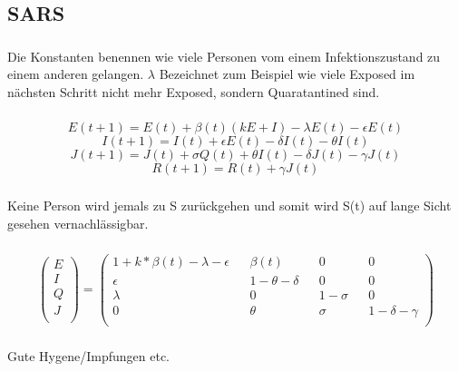 \documentclass{article}
\begin{document}
\subsection{SARS}

\subsubsection{}
Die Konstanten benennen wie viele Personen vom einem Infektionszustand zu einem anderen gelangen.
$\lambda$ Bezeichnet zum Beispiel wie viele Exposed im nächsten Schritt nicht mehr Exposed, sondern Quaratantined sind.

\subsubsection{}
$$E(t+1) = E(t) + \beta(t)(kE+I) - \lambda E(t) - \epsilon E(t) $$
$$I(t+1) = I(t) + \epsilon E(t) - \delta I(t) - \theta I(t)$$
$$J(t+1) = J(t) + \sigma Q(t) + \theta I(t) - \delta J(t) - \gamma J(t)$$
$$R(t+1) = R(t) + \gamma J(t)$$

\subsubsection{}
Keine Person wird jemals zu S zurückgehen und somit wird S(t) auf lange Sicht gesehen vernachlässigbar.

\subsubsection{}
\[
    \begin{pmatrix}
    E \\
    I \\
    Q \\
    J \\
    \end{pmatrix}
    =
    \begin{pmatrix}
     1 + k * \beta (t) - \lambda - \epsilon && \beta (t) && 0 && 0\\
     \epsilon &&  1 - \theta - \delta && 0 && 0\\
     \lambda && 0 && 1 - \sigma && 0 \\
     0 &&  \theta && \sigma && 1 - \delta - \gamma \\
    \end{pmatrix}
\]

\subsubsection{}

\subsubsection{}

\subsubsection{}

\subsubsection{}
Gute Hygene/Impfungen etc.

\end{document}
